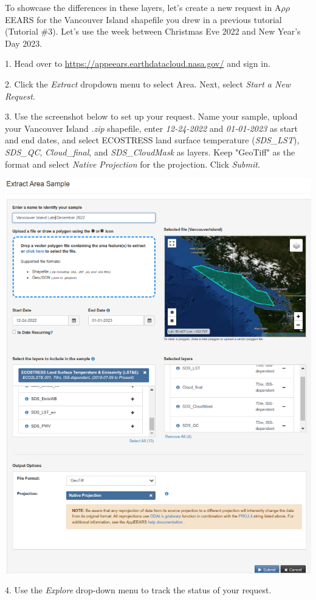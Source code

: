 \documentclass[oneside,a4paper,11pt,explicit]{book}
\begin{document}
	To showcase the differences in these layers, let's create a new request in A$\rho\rho$EEARS for the Vancouver Island shapefile you drew in a previous tutorial (Tutorial \#3). Let's use the week between Christmas Eve 2022 and New Year's Day 2023.
	
	1. Head over to \href{https://appeears.earthdatacloud.nasa.gov/}{https://appeears.earthdatacloud.nasa.gov/} and sign in.
	
	2. Click the \textit{Extract} dropdown menu to select Area. Next, select \textit{Start a New Request}.
	
	3. Use the screenshot below to set up your request. Name your sample, upload your Vancouver Island \textit{.zip} shapefile, enter \textit{12-24-2022} and \textit{01-01-2023} as start and end dates, and select ECOSTRESS land surface temperature (\textit{SDS\_LST}), \textit{SDS\_QC}, \textit{Cloud\_final}, and \textit{SDS\_CloudMask} as layers. Keep "GeoTiff" as the format and select \textit{Native Projection} for the projection. Click \textit{Submit}.
	
	\centerline{\includegraphics[width=.75\textwidth]{ExtractVancouver.png}}
	
	4. Use the \textit{Explore} drop-down menu to track the status of your request. 
	
	\vspace{.25em}
	
\end{document}
